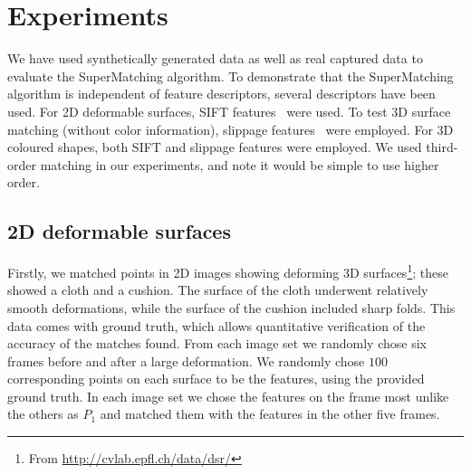 \section{Experiments}
\label{sec:experiments}

We have used synthetically generated data as well as real captured data to evaluate the SuperMatching algorithm.
To demonstrate that the SuperMatching algorithm is independent of feature descriptors, several descriptors have been used.
For 2D deformable surfaces,
SIFT features~\cite{Lowe04} were used.
To test 3D surface matching (without color information), slippage features~\cite{Bokeloh08} were employed.
For 3D coloured shapes, both SIFT and slippage features were employed.
We used third-order matching in our experiments, and note it would be simple to use higher order.


\subsection{2D deformable surfaces}
\label{subsec:2DDeformable}

Firstly, we matched points in 2D images showing deforming 3D surfaces\footnote{From \url{http://cvlab.epfl.ch/data/dsr/}}; these showed a cloth and a cushion.
The surface of the cloth underwent relatively smooth deformations, while the surface of the cushion included sharp folds.
This data comes with ground truth, which allows quantitative verification of the accuracy of the matches found.
From each image set we randomly chose six frames before and after a large deformation.
We randomly chose $100$ corresponding points on each surface to be the features, using the provided ground truth.
In each image set we chose the features on the frame most unlike the others as $P_1$
and matched them with the features in the other five frames.

